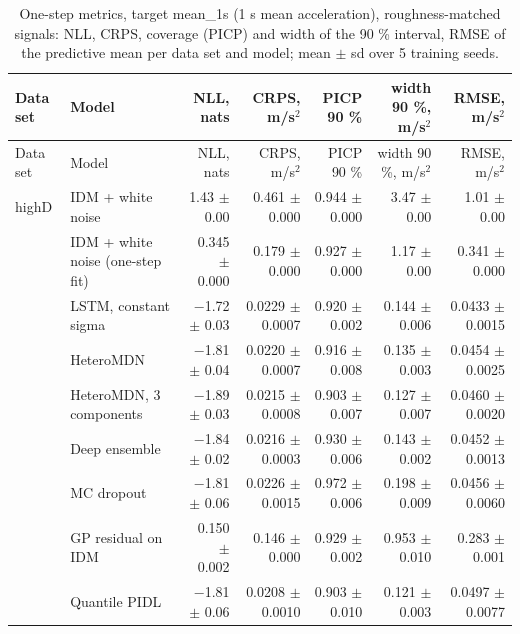 \begingroup
\footnotesize
\begin{longtable}{llrrrrr}
\caption{One-step metrics, target mean\_1s (1 s mean acceleration), roughness-matched signals: NLL, CRPS, coverage (PICP) and width of the 90 \% interval, RMSE of the predictive mean per data set and model; mean $\pm$ sd over 5 training seeds.}\label{tab:t1-one-step--matched--mean-1s} \\
\toprule
Data set & Model & NLL, nats & CRPS, m/s$^2$ & PICP 90 \% & width 90 \%, m/s$^2$ & RMSE, m/s$^2$ \\
\midrule
\endfirsthead
\toprule
Data set & Model & NLL, nats & CRPS, m/s$^2$ & PICP 90 \% & width 90 \%, m/s$^2$ & RMSE, m/s$^2$ \\
\midrule
\endhead
\bottomrule
\endlastfoot
highD & IDM + white noise & 1.43 $\pm$ 0.00 & 0.461 $\pm$ 0.000 & 0.944 $\pm$ 0.000 & 3.47 $\pm$ 0.00 & 1.01 $\pm$ 0.00 \\
 & IDM + white noise (one-step fit) & 0.345 $\pm$ 0.000 & 0.179 $\pm$ 0.000 & 0.927 $\pm$ 0.000 & 1.17 $\pm$ 0.00 & 0.341 $\pm$ 0.000 \\
 & LSTM, constant sigma & $-$1.72 $\pm$ 0.03 & 0.0229 $\pm$ 0.0007 & 0.920 $\pm$ 0.002 & 0.144 $\pm$ 0.006 & 0.0433 $\pm$ 0.0015 \\
 & HeteroMDN & $-$1.81 $\pm$ 0.04 & 0.0220 $\pm$ 0.0007 & 0.916 $\pm$ 0.008 & 0.135 $\pm$ 0.003 & 0.0454 $\pm$ 0.0025 \\
 & HeteroMDN, 3 components & $-$1.89 $\pm$ 0.03 & 0.0215 $\pm$ 0.0008 & 0.903 $\pm$ 0.007 & 0.127 $\pm$ 0.007 & 0.0460 $\pm$ 0.0020 \\
 & Deep ensemble & $-$1.84 $\pm$ 0.02 & 0.0216 $\pm$ 0.0003 & 0.930 $\pm$ 0.006 & 0.143 $\pm$ 0.002 & 0.0452 $\pm$ 0.0013 \\
 & MC dropout & $-$1.81 $\pm$ 0.06 & 0.0226 $\pm$ 0.0015 & 0.972 $\pm$ 0.006 & 0.198 $\pm$ 0.009 & 0.0456 $\pm$ 0.0060 \\
 & GP residual on IDM & 0.150 $\pm$ 0.002 & 0.146 $\pm$ 0.000 & 0.929 $\pm$ 0.002 & 0.953 $\pm$ 0.010 & 0.283 $\pm$ 0.001 \\
 & Quantile PIDL & $-$1.81 $\pm$ 0.06 & 0.0208 $\pm$ 0.0010 & 0.903 $\pm$ 0.010 & 0.121 $\pm$ 0.003 & 0.0497 $\pm$ 0.0077 \\

\end{longtable}
